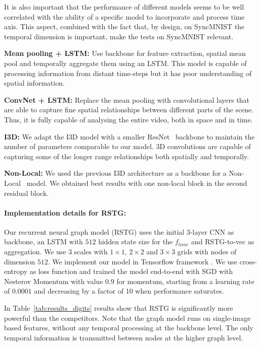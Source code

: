 \documentclass{article}
\begin{document}
It is also important that the performance of different models seems to be well correlated with the ability of a specific model to incorporate and process time axis. This aspect, combined with the fact that, by design, on SyncMNIST the temporal dimension is important, make the tests on SyncMNIST relevant. 


\textbf{Mean pooling + LSTM:} Use backbone for feature extraction, spatial mean pool and temporally aggregate them using an LSTM. This model is capable of processing information from distant time-steps but it has poor understanding of spatial information.

\textbf{ConvNet + LSTM:} Replace the mean pooling with convolutional layers that are able to capture fine spatial relationships between different parts of the scene. Thus, it is fully capable of analysing the entire video, both in space and in time.

\textbf{I3D:} We adapt the I3D model \cite{carreira2017quo} with a smaller ResNet~\cite{He2016DeepRL_resnet} backbone to maintain the number of parameters comparable to our model. 3D convolutions are capable of capturing some of the longer range relationships both spatially and temporally.

\textbf{Non-Local:}  We used the previous I3D architecture as a backbone for a Non-Local~\cite{wang2018non_local} model. We obtained best results with one non-local block in the second residual block.

\paragraph{Implementation details for RSTG:}
Our recurrent neural graph model (RSTG) uses the initial \mbox{3-layer} CNN as backbone, an LSTM with $512$ hidden state size for the $f_{time}$ and RSTG-to-vec as aggregation. We use 3 scales with $1\times1$, $2\times2$ and $3\times3$ grids with nodes of dimension $512$. We implement our model in Tensorflow framework \cite{tensorflow2015-whitepaper}. We use cross-entropy as loss function and trained the model end-to-end with SGD with Nesterov Momentum with value $0.9$ for momentum, starting from a learning rate of $0.0001$ and decreasing by a factor of 10 when performance saturates. 

In Table~\ref{tab:results_digits} results  show that RSTG is significantly more powerful than the competitors. Note that the graph model runs on single-image based features, without any temporal processing at the backbone level. The only temporal information is transmitted between nodes at the higher graph level.
\end{document}

